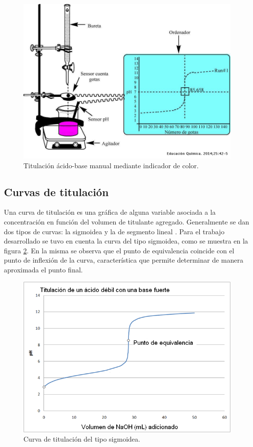 \begin{figure}[htbp]
	\centering
	\includegraphics[width=.7\textwidth]{./Figures/titulacionPotManual.jpeg}
	\caption{Titulación ácido-base manual mediante indicador de color\protect\footnotemark.}
	\label{fig:titManualPot}
\end{figure}


\subsection{Curvas de titulación}

Una curva de titulación es una gráfica de alguna variable asociada a la concentración en función del volumen de titulante agregado. Generalmente se dan dos tipos de curvas: la sigmoidea y la de segmento lineal \citep{BOOK:1}.
Para el trabajo desarrollado se tuvo en cuenta la curva del tipo sigmoidea, como se muestra en la figura \ref{fig:sigmoidea}. En la misma se observa que el punto de equivalencia coincide con el punto de inflexión de la curva, característica que permite determinar de manera aproximada el punto final. 

\begin{figure}[htbp]
	\centering
	\includegraphics[width=.5\textwidth]{./Figures/curvaTitulacion1.png}
	\caption{Curva de titulación del tipo sigmoidea\protect\footnotemark.}
	\label{fig:sigmoidea}
\end{figure}


